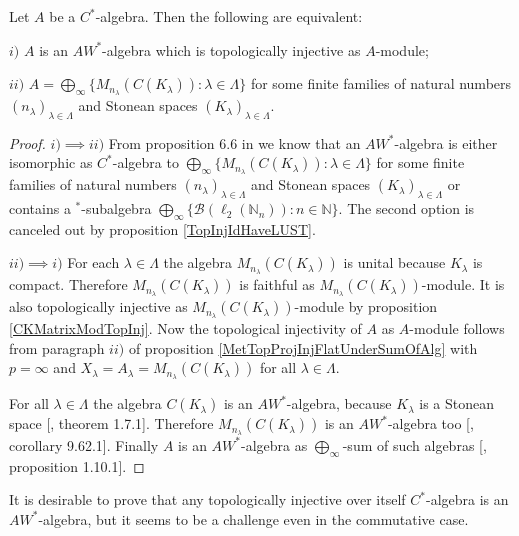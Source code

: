 \begin{theorem}\label{TopInjAWStarAlgCharac} Let $A$ be a $C^*$-algebra. Then the following are equivalent:

$i)$ $A$ is an $AW^*$-algebra which is topologically injective as $A$-module;

$ii)$ $A=\bigoplus_\infty\{M_{n_\lambda}(C(K_\lambda)):\lambda\in\Lambda\}$ for some finite families of natural numbers $(n_\lambda)_{\lambda\in\Lambda}$ and Stonean spaces $(K_\lambda)_{\lambda\in\Lambda}$.
\end{theorem}
\begin{proof}$i)\implies ii)$ From proposition 6.6 in \cite{SmithDecompPropCStarAlg} we know that an $AW^*$-algebra is either isomorphic as $C^*$-algebra to $\bigoplus_\infty\{M_{n_\lambda}(C(K_\lambda)):\lambda\in\Lambda\}$ for some finite families of natural numbers $(n_\lambda)_{\lambda\in\Lambda}$ and Stonean spaces $(K_\lambda)_{\lambda\in\Lambda}$ or contains a ${}^*$-subalgebra $\bigoplus_\infty\{ \mathcal{B}(\ell_2(\mathbb{N}_n)):n\in\mathbb{N}\}$. The second option is canceled out by proposition \ref{TopInjIdHaveLUST}.

$ii)\implies i)$ For each $\lambda\in\Lambda$ the algebra $M_{n_\lambda}(C(K_\lambda))$ is unital because $K_\lambda$ is compact. Therefore $M_{n_\lambda}(C(K_\lambda))$ is faithful as $M_{n_\lambda}(C(K_\lambda))$-module. It is also topologically injective as $M_{n_\lambda}(C(K_\lambda))$-module by proposition  \ref{CKMatrixModTopInj}. Now the topological injectivity of $A$ as $A$-module follows from paragraph $ii)$ of proposition \ref{MetTopProjInjFlatUnderSumOfAlg} with $p=\infty$ and $X_\lambda=A_\lambda=M_{n_\lambda}(C(K_\lambda))$ for all $\lambda\in\Lambda$. 

For all $\lambda\in\Lambda$ the algebra $C(K_\lambda)$ is an $AW^*$-algebra, because $K_\lambda$ is a Stonean space [\cite{BerbBaerStarRings}, theorem 1.7.1]. Therefore $M_{n_\lambda}(C(K_\lambda))$ is an $AW^*$-algebra too [\cite{BerbBaerStarRings}, corollary 9.62.1]. Finally $A$ is an $AW^*$-algebra as $\bigoplus_\infty$-sum of such algebras [\cite{BerbBaerStarRings}, proposition 1.10.1].
\end{proof}

It is desirable to prove that any topologically injective over itself $C^*$-algebra is an $AW^*$-algebra, but it seems to be a challenge even in the commutative case.


